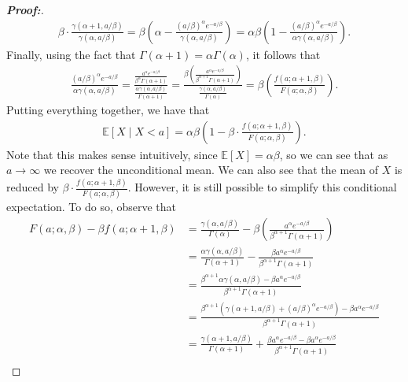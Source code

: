 \documentclass[11pt,twoside]{article}
\theoremstyle{definition}
\theoremstyle{remark}
\begin{document}
\begin{proof}[\textbf{Proof:}]
\begin{align*}
    \beta \cdot \frac{\gamma(\alpha + 1, a / \beta)}{\gamma(\alpha, a / \beta)} = \beta \left(\alpha - \frac{(a / \beta)^\alpha e^{- a / \beta}}{\gamma(\alpha, a / \beta)}\right) = \alpha \beta \left(1 - \frac{(a / \beta)^\alpha e^{- a / \beta}}{\alpha \gamma(\alpha, a / \beta)}\right).
\end{align*}
Finally, using the fact that $\Gamma(\alpha + 1) = \alpha \Gamma(\alpha)$, it follows that
\begin{align*}
     \frac{(a / \beta)^\alpha e^{- a / \beta}}{\alpha \gamma(\alpha, a / \beta)} = \frac{\frac{a^\alpha e^{- a / \beta}}{\beta^\alpha \Gamma(\alpha + 1)} }{\frac{\alpha \gamma(\alpha, a / \beta)}{\Gamma(\alpha + 1)}} = \frac{\beta \left(\frac{a^\alpha e^{- a / \beta}}{\beta^{\alpha+1} \Gamma(\alpha + 1)} \right) }{\frac{\gamma(\alpha, a / \beta)}{\Gamma(\alpha)}} = \beta \left(\frac{f(a; \alpha + 1, \beta)}{F(a; \alpha, \beta)} \right).
\end{align*}
Putting everything together, we have that
\begin{align*}
    \mathbb{E}\left[X \mid X < a \right] = \alpha \beta \left(1 - \beta \cdot \frac{f(a; \alpha + 1, \beta)}{F(a; \alpha, \beta)}\right).
\end{align*}
Note that this makes sense intuitively, since $\mathbb{E}[X] = \alpha \beta$, so we can see that as $a \to \infty$ we recover the unconditional mean. We can also see that the mean of $X$ is reduced by $\beta \cdot \frac{f(a; \alpha + 1, \beta)}{F(a; \alpha, \beta)}$. However, it is still possible to simplify this conditional expectation. To do so, observe that
\begin{align*}
    F(a; \alpha, \beta) - \beta f(a ; \alpha + 1, \beta) &= \frac{\gamma(\alpha, a / \beta)}{\Gamma(\alpha)} - \beta \left(\frac{a^\alpha e^{- a / \beta}}{\beta^{\alpha+1} \Gamma(\alpha + 1)} \right) \\
    &= \frac{\alpha \gamma(\alpha, a / \beta)}{\Gamma(\alpha + 1)} - \frac{\beta a^\alpha e^{- a / \beta}}{\beta^{\alpha+1} \Gamma(\alpha + 1)} \\
    &= \frac{\beta^{\alpha + 1} \alpha \gamma(\alpha, a / \beta) - \beta a^\alpha e^{- a / \beta}}{\beta^{\alpha + 1}\Gamma(\alpha + 1)} \\
    &= \frac{\beta^{\alpha + 1} \left( \gamma(\alpha + 1, a / \beta) + (a / \beta)^\alpha e^{- a / \beta}\right) - \beta a^\alpha e^{- a / \beta}}{\beta^{\alpha + 1}\Gamma(\alpha + 1)} \\
    &= \frac{ \gamma(\alpha + 1, a / \beta)}{\Gamma(\alpha + 1)} + \frac{\beta a^\alpha e^{- a / \beta} - \beta a^\alpha e^{- a / \beta}}{\beta^{\alpha + 1}\Gamma(\alpha + 1)} \\

\end{align*}
\end{proof}
\end{document}

